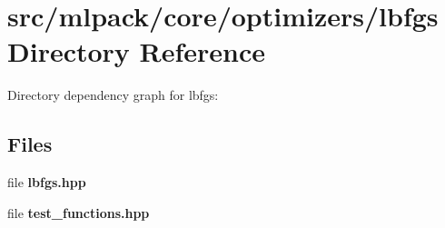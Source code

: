 \section{src/mlpack/core/optimizers/lbfgs Directory Reference}
\label{dir_fabb4d1dde1c477c2e0290f9b68d220a}
Directory dependency graph for lbfgs\-:
\subsection*{Files}
\begin{DoxyCompactItemize}
\item 
file {\bf lbfgs.\-hpp}
\item 
file {\bf test\-\_\-functions.\-hpp}
\end{DoxyCompactItemize}
